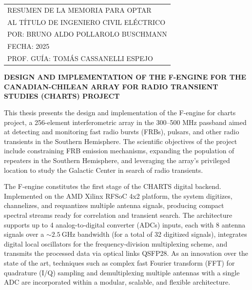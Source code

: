 \documentclass[
	12pt,
	letterpaper,
  oneside
  ]{book}
\newenvironment{preliminary}{
  \pagestyle{plain}\pagenumbering{roman}
  }{\cleardoublepage\pagenumbering{arabic}}
\begin{document}
  \newpage
  
  \begin{preliminary}
  
  
  \setcounter{page}{1}

  \begin{flushright}
    \begin{tabular}{l}
      RESUMEN DE LA MEMORIA PARA OPTAR \\
      AL TÍTULO DE INGENIERO CIVIL ELÉCTRICO \\
      POR: \MakeUppercase{Bruno Aldo Pollarolo Buschmann} \\
      FECHA: 2025 \\
      PROF. GUÍA: TOMÁS CASSANELLI ESPEJO
    \end{tabular}
  \end{flushright}

  \begin{center}
    \MakeUppercase{\textbf{Design and implementation of the F-engine for the Canadian-Chilean Array for Radio Transient Studies (CHARTS) project}}
  \end{center}

  This thesis presents the design and implementation of the F-engine for \gls{charts} project, a 256-element interferometric array in the 300--500 MHz passband aimed at detecting and monitoring fast radio bursts (FRBs), pulsars, and other radio transients in the Southern Hemisphere. The scientific objectives of the project include constraining FRB emission mechanisms, expanding the population of repeaters in the Southern Hemisphere, and leveraging the array's privileged location to study the Galactic Center in search of radio transients.

  The F-engine constitutes the first stage of the CHARTS digital backend. Implemented on the AMD Xilinx RFSoC 4x2 platform, the system digitizes, channelizes, and requantizes multiple antenna signals, producing compact spectral streams ready for correlation and transient search. The architecture supports up to 4 analog-to-digital converter (ADCs) inputs, each with 8 antenna signals over a $\sim\qty{2.5}{\giga\hertz}$ bandwidth (for a total of \num{32} digitized signals), integrates digital local oscillators for the frequency-division multiplexing scheme, and transmits the processed data via optical links QSFP28. As an innovation over the state of the art, techniques such as complex fast Fourier transform (FFT) for quadrature (I/Q) sampling and demultiplexing multiple antennas with a single ADC are incorporated within a modular, scalable, and flexible architecture.


\end{preliminary}
\end{document}

